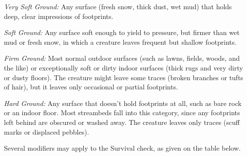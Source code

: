 \textit{Very Soft Ground:} Any surface (fresh snow, thick dust, wet mud) that holds 
deep, clear impressions of footprints.

\textit{Soft Ground:} Any surface soft enough to yield to pressure, but firmer 
than wet mud or fresh snow, in which a creature leaves frequent but shallow footprints.

\textit{Firm Ground:} Most normal outdoor surfaces (such as lawns, fields, woods, 
and the like) or exceptionally soft or dirty indoor surfaces (thick rugs and very 
dirty or dusty floors). The creature might leave some traces (broken branches or 
tufts of hair), but it leaves only occasional or partial footprints.

\textit{Hard Ground:} Any surface that doesn't hold footprints at all, such as 
bare rock or an indoor floor. Most streambeds fall into this category, since any 
footprints left behind are obscured or washed away. The creature leaves only traces 
(scuff marks or displaced pebbles). 

Several modifiers may apply to the Survival check, as given on the table below.

